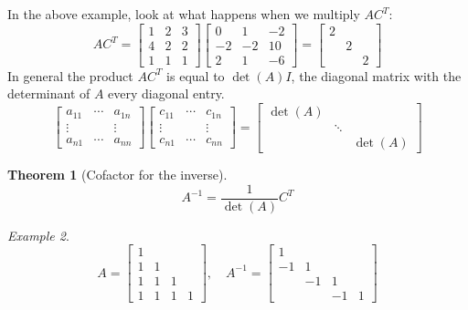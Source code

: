\documentclass[11pt,oneside]{amsbook}
\theoremstyle{definition}
\theoremstyle{plain}
\newtheorem{theorem}{Theorem}[section]
\theoremstyle{definition}
\theoremstyle{remark}
\newtheorem{example}[theorem]{Example}
\numberwithin{equation}{section}
\numberwithin{figure}{section}
\begin{document}
In the above example, look at what happens when we multiply $AC^T$:
\[AC^T=\begin{bmatrix}1&2&3\\4&2&2\\1&1&1\end{bmatrix}
  \begin{bmatrix}0&1&-2\\-2&-2&10\\2&1&-6\end{bmatrix}
  =\begin{bmatrix}2\\&2\\&&2\end{bmatrix}
\]
In general the product $AC^T$ is equal to $\det(A)I$, the diagonal matrix with the determinant of $A$ every diagonal entry.
\[\begin{bmatrix}
    a_{11}&\cdots&a_{1n}\\
    \vdots&&\vdots\\
    a_{n1}&\cdots&a_{nn}
  \end{bmatrix}
  \begin{bmatrix}
    c_{11}&\cdots&c_{1n}\\
    \vdots&&\vdots\\
    c_{n1}&\cdots&c_{nn}
  \end{bmatrix}
  =\begin{bmatrix}
    \det(A)\\&\ddots\\&&\det(A)
  \end{bmatrix}
\]

\begin{theorem}[Cofactor for the inverse]
  \[A^{-1}=\frac{1}{\det(A)}C^T
  \]
\end{theorem}

\begin{example}
  \[A=\begin{bmatrix}1\\1&1\\1&1&1\\1&1&1&1\end{bmatrix},\quad
    A^{-1}=\begin{bmatrix}1\\-1&1\\&-1&1\\&&-1&1\end{bmatrix}
  \]
\end{example}
\end{document}
